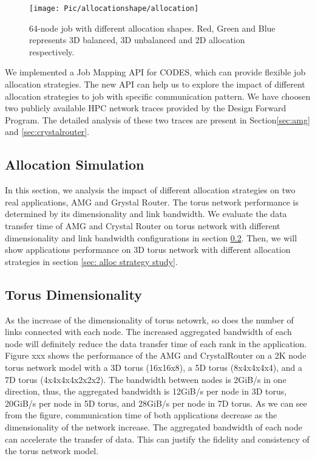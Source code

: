 \documentclass[conference]{IEEEtran}
\begin{document}
\begin{figure}[h!] 
  \centering
  \texttt{[image: Pic/allocationshape/allocation]}
  \caption{64-node job with different allocation shapes. Red, Green and Blue represents 3D balanced, 3D unbalanced and 2D allocation respectively. }
  \label{fig: allocation}
\end{figure}

We implemented a Job Mapping API for CODES, which can provide flexible job allocation strategies. The new API can help us to explore the impact of different allocation strategies to job with specific communication pattern. We have choosen two publicly available HPC network traces provided by the Design Forward Program\cite{design forward webpage}. The detailed analysis of these two traces are present in Section\ref{sec:amg} and \ref{sec:crystalrouter}.


\subsection{Allocation Simulation}
\label{sec:alloc sim}

In this section, we analysis the impact of different allocation strategies on two real applications, AMG and Grystal Router. The torus network performance is determined by its dimensionality and link bandwidth. We evaluate the data transfer time of AMG and Crystal Router on torus network with different dimensionality and link bandwidth configurations in section \ref{sec: dimensionality study}. Then, we will show applications performance on 3D torus network with different allocation strategies in section \ref{sec: alloc strategy study}.

\subsection{Torus Dimensionality}
\label{sec: dimensionality study}

As the increase of the dimensionality of torus netowrk, so does the number of links connected with each node. The increased aggregated bandwidth of each node will definitely reduce the data transfer time of each rank in the application. Figure xxx shows the performance of the AMG and CrystalRouter on a 2K node torus network model with a 3D torus (16x16x8), a 5D torus (8x4x4x4x4), and a 7D torus (4x4x4x4x2x2x2). The bandwidth between nodes is 2GiB/s in one direction, thus, the aggregated bandwidth is 12GiB/s per node in 3D torus, 20GiB/s per node in 5D torus, and 28GiB/s per node in 7D torus. As we can see from the figure, communication time of both applications decrease as the dimensionality of the network increase. The aggregated bandwidth of each node can accelerate the transfer of data. This can justify the fidelity and consistency of the torus network model.
\end{document}
